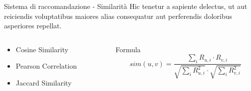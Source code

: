 \documentclass{beamer}
\begin{document}
	\begin{frame}{Sistema di raccomandazione - Similarità}
		Hic tenetur a sapiente delectus, ut aut reiciendis voluptatibus maiores alias consequatur aut perferendis doloribus asperiores repellat.

		\begin{columns}
			\begin{column}{0.6\textwidth}
				\begin{itemize}
					\item Cosine Similarity
					\item Pearson Correlation
					\item Jaccard Similarity
				\end{itemize}
			\end{column}
			\begin{column}{0.4\textwidth}
				\begin{exampleblock}{Formula}
					$$ sim(u,v) = \frac{\sum_{i} R_{u,i} \cdot R_{v,i}}{\sqrt{\sum_{i} R_{u,i}^2} \cdot \sqrt{\sum_{i} R_{v,i}^2}} $$
				\end{exampleblock}
			\end{column}
		\end{columns}
	\end{frame}
\end{document}
